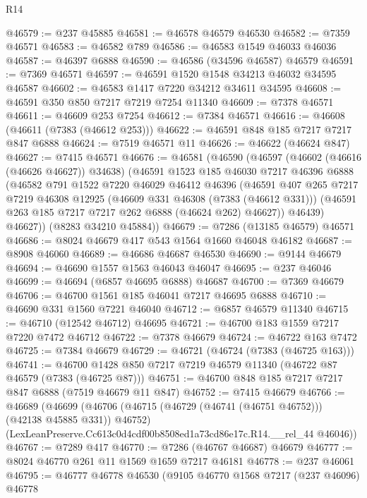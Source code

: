 \begin{lexlean}{R14}
\begin{coremodule}
@46579 := @237 @45885
@46581 := @46578 @46579 @46530
@46582 := @7359 @46571
@46583 := @46582 @789
@46586 := @46583 @1549 @46033 @46036
@46587 := @46397 @6888
@46590 := @46586 (@34596 @46587) @46579
@46591 := @7369 @46571
@46597 := @46591 @1520 @1548 @34213 @46032 @34595 @46587
@46602 := @46583 @1417 @7220 @34212 @34611 @34595
@46608 := @46591 @350 @850 @7217 @7219 @7254 @11340
@46609 := @7378 @46571
@46611 := @46609 @253 @7254
@46612 := @7384 @46571
@46616 := @46608 (@46611 (@7383 (@46612 @253)))
@46622 := @46591 @848 @185 @7217 @7217 @847 @6888
@46624 := @7519 @46571 @11
@46626 := @46622 (@46624 @847)
@46627 := @7415 @46571
@46676 := @46581
    (@46590
      (@46597
        (@46602 (@46616 (@46626 @46627)) @34638)
        (@46591
          @1523
          @185
          @46030
          @7217
          @46396
          @6888
          (@46582
            @791
            @1522
            @7220
            @46029
            @46412
            @46396
            (@46591
              @407
              @265
              @7217
              @7219
              @46308
              @12925
              (@46609 @331 @46308 (@7383 (@46612 @331)))
              (@46591 @263 @185 @7217 @7217 @262 @6888 (@46624 @262) @46627))
            @46439)
          @46627))
      (@8283 @34210 @45884))
@46679 := @7286 (@13185 @46579) @46571
@46686 := @8024 @46679 @417 @543 @1564 @1660 @46048 @46182
@46687 := @8908 @46060
@46689 := @46686 @46687 @46530
@46690 := @9144 @46679
@46694 := @46690 @1557 @1563 @46043 @46047
@46695 := @237 @46046
@46699 := @46694 (@6857 @46695 @6888) @46687
@46700 := @7369 @46679
@46706 := @46700 @1561 @185 @46041 @7217 @46695 @6888
@46710 := @46690 @331 @1560 @7221 @46040
@46712 := @6857 @46579 @11340
@46715 := @46710 (@12542 @46712) @46695
@46721 := @46700 @183 @1559 @7217 @7220 @7472 @46712
@46722 := @7378 @46679
@46724 := @46722 @163 @7472
@46725 := @7384 @46679
@46729 := @46721 (@46724 (@7383 (@46725 @163)))
@46741 := @46700 @1428 @850 @7217 @7219 @46579 @11340 (@46722 @87 @46579 (@7383 (@46725 @87)))
@46751 := @46700 @848 @185 @7217 @7217 @847 @6888 (@7519 @46679 @11 @847)
@46752 := @7415 @46679
@46766 := @46689
    (@46699
      (@46706 (@46715 (@46729 (@46741 (@46751 @46752))) (@42138 @45885 @331)) @46752)
      (LexLeanPreserve.Cc613c0d4cdf00b8508ed1a73cd86e17c.R14.__rel_44 @46046))
@46767 := @7289 @417
@46770 := @7286 (@46767 @46687) @46679
@46777 := @8024 @46770 @261 @11 @1569 @1659 @7217 @46181
@46778 := @237 @46061
@46795 := @46777
    @46778
    @46530
    (@9105
      @46770
      @1568
      @7217
      (@237 @46096)
      @46778

\end{coremodule}
\end{lexlean}

